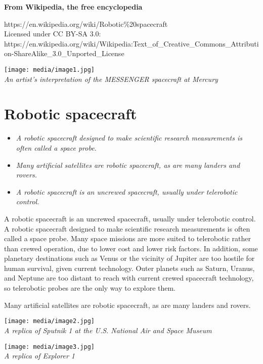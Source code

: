\textbf{From Wikipedia, the free encyclopedia}

https://en.wikipedia.org/wiki/Robotic\%20spacecraft\\
Licensed under CC BY-SA 3.0:\\
https://en.wikipedia.org/wiki/Wikipedia:Text\_of\_Creative\_Commons\_Attribution-ShareAlike\_3.0\_Unported\_License

\texttt{[image: media/image1.jpg]}\\
\emph{An artist's interpretation of the MESSENGER spacecraft at Mercury}

\section{Robotic spacecraft}\label{robotic-spacecraft}

\begin{itemize}
\item
  \emph{A robotic spacecraft designed to make scientific research
  measurements is often called a space probe.}
\item
  \emph{Many artificial satellites are robotic spacecraft, as are many
  landers and rovers.}
\item
  \emph{A robotic spacecraft is an uncrewed spacecraft, usually under
  telerobotic control.}
\end{itemize}

A robotic spacecraft is an uncrewed spacecraft, usually under
telerobotic control. A robotic spacecraft designed to make scientific
research measurements is often called a space probe. Many space missions
are more suited to telerobotic rather than crewed operation, due to
lower cost and lower risk factors. In addition, some planetary
destinations such as Venus or the vicinity of Jupiter are too hostile
for human survival, given current technology. Outer planets such as
Saturn, Uranus, and Neptune are too distant to reach with current crewed
spacecraft technology, so telerobotic probes are the only way to explore
them.

Many artificial satellites are robotic spacecraft, as are many landers
and rovers.

\texttt{[image: media/image2.jpg]}\\
\emph{A replica of Sputnik 1 at the U.S. National Air and Space Museum}

\texttt{[image: media/image3.jpg]}\\
\emph{A replica of Explorer 1}

